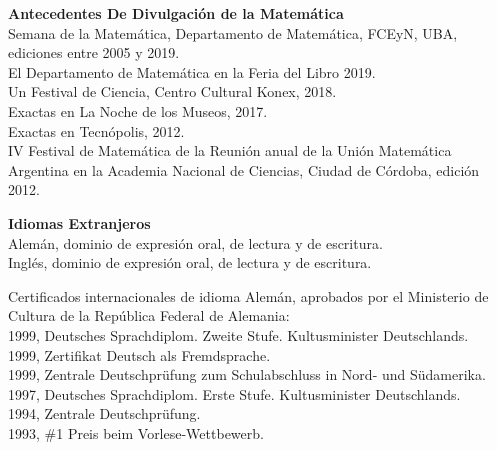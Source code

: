 \textbf{Antecedentes De Divulgaci\'on de la Matem\'atica}\\[6pt]
Semana de la Matem\'atica,  Departamento de Matem\'atica, FCEyN, UBA,
ediciones entre 2005 y 2019.\\[4pt]
El Departamento de Matem\'atica en la Feria del Libro 2019.\\[4pt]
Un Festival de Ciencia, Centro Cultural Konex, 2018.\\[4pt]
Exactas en La Noche de los Museos, 2017.\\[4pt] 
Exactas en Tecn\'opolis, 2012.\\[4pt]
IV Festival de Matem\'atica de la Reuni\'on anual de la Uni\'on Ma\-te\-m\'a\-ti\-ca
Argentina en la Academia Nacional de Ciencias, Ciudad de C\'ordoba,
edici\'on 2012.

\textbf{Idiomas Extranjeros}\\[6pt]
Alem\'an, dominio de expresi\'on oral, de lectura y de escritura.\\[4pt]
Ingl\'es, dominio de expresi\'on oral, de lectura y de escritura.

Certificados internacionales de idioma Alem\'an, aprobados por el
Ministerio de Cultura de la Rep\'ublica Federal de Alemania:\\[6pt]
1999, Deutsches Sprachdiplom. Zweite Stufe. Kultusminister Deutschlands.\\[4pt]
1999, Zertifikat Deutsch als Fremdsprache.\\[4pt]
1999, Zentrale Deutschpr\"ufung zum Schulabschluss in Nord- und S\"udamerika.\\[4pt]
1997, Deutsches Sprachdiplom. Erste Stufe. Kultusminister Deutschlands.\\[4pt]
1994, Zentrale Deutschpr\"{u}fung.\\[4pt]
1993, \#1 Preis beim Vorlese-Wettbewerb.